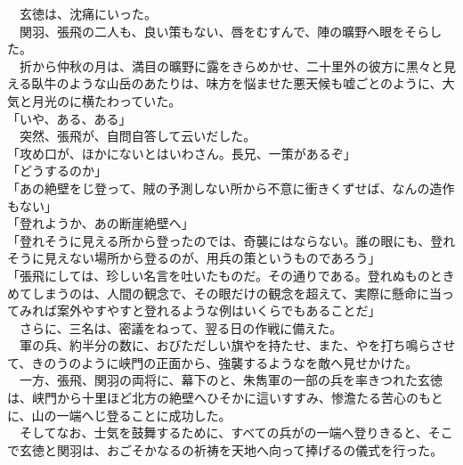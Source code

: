\documentclass[
  paper=a5,
  fontsize=10pt,
  jafontsize=9.5pt,
  tate,                  %
  open_bracket_pos=nibu, %
]{jlreq}
\begin{document}
　玄徳は、沈痛にいった。\\


　関羽、張飛の二人も、良い策もない、唇をむすんで、陣の曠野へ眼をそらした。\\


　折から仲秋の月は、満目の曠野に露をきらめかせ、二十里外の彼方に黒々と見える臥牛のような山岳のあたりは、味方を悩ませた悪天候も嘘ごとのように、大気と月光のに横たわっていた。\\


「いや、ある、ある」\\


　突然、張飛が、自問自答して云いだした。\\


「攻め口が、ほかにないとはいわさん。長兄、一策があるぞ」\\


「どうするのか」\\


「あの絶壁をじ登って、賊の予測しない所から不意に衝きくずせば、なんの造作もない」\\


「登れようか、あの断崖絶壁へ」\\


「登れそうに見える所から登ったのでは、奇襲にはならない。誰の眼にも、登れそうに見えない場所から登るのが、用兵の策というものであろう」\\


「張飛にしては、珍しい名言を吐いたものだ。その通りである。登れぬものときめてしまうのは、人間の観念で、その眼だけの観念を超えて、実際に懸命に当ってみれば案外やすやすと登れるような例はいくらでもあることだ」\\


　さらに、三名は、密議をねって、翌る日の作戦に備えた。\\


　軍の兵、約半分の数に、おびただしい旗やを持たせ、また、やを打ち鳴らさせて、きのうのように峡門の正面から、強襲するようなを敵へ見せかけた。\\


　一方、張飛、関羽の両将に、幕下のと、朱雋軍の一部の兵を率きつれた玄徳は、峡門から十里ほど北方の絶壁へひそかに這いすすみ、惨澹たる苦心のもとに、山の一端へじ登ることに成功した。\\


　そしてなお、士気を鼓舞するために、すべての兵がの一端へ登りきると、そこで玄徳と関羽は、おごそかなるの祈祷を天地へ向って捧げるの儀式を行った。\\
\end{document}
